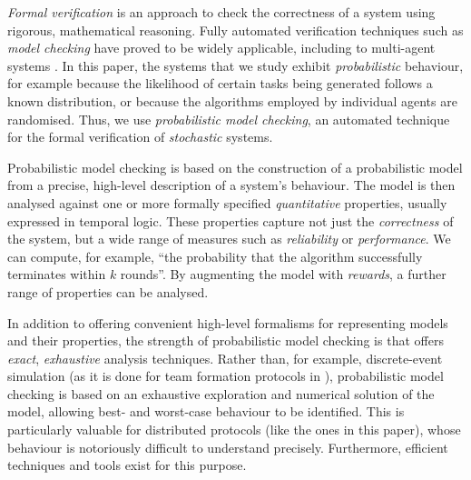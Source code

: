 \documentclass{llncs}
\newcommand{\dave}[1]{\marginpar{\footnotesize \color{red} {\bf D:} \textsf{#1}}}
\begin{document}
\emph{Formal verification} is an approach to check the correctness of a system
using rigorous, mathematical reasoning.
Fully automated verification techniques such as \emph{model checking}
have proved to be widely applicable,
including to multi-agent systems \cite{lomuscio2006mcmas}.
In this paper, the systems that we study exhibit \emph{probabilistic} behaviour,
for example because the likelihood of certain tasks being generated follows a known distribution,
or because the algorithms employed by individual agents are randomised.
Thus, we use \emph{probabilistic model checking}, an automated technique for
the formal verification of \emph{stochastic} systems.
%

Probabilistic model checking is based
on the construction of a probabilistic model from a precise,
high-level description of a system's behaviour.
The model is then analysed against one or more formally specified \emph{quantitative} properties,
usually expressed in temporal logic.
These properties capture not just the \emph{correctness} of the system,
but a wide range of measures such as \emph{reliability} or \emph{performance}.
We can compute, for example, ``the probability that the algorithm successfully terminates within $k$ rounds''.
By augmenting the model with \emph{rewards}, a further range of properties can be analysed.

In addition to offering convenient high-level formalisms for representing models and their properties,
the strength of probabilistic model checking is that offers \emph{exact}, \emph{exhaustive} analysis techniques.
Rather than, for example, discrete-event simulation
(as it is done for team formation protocols in \cite{gaston2005agent}),
probabilistic model checking is based on an exhaustive exploration and numerical solution of the model,
allowing best- and worst-case behaviour to be identified.
This is particularly valuable for distributed protocols (like the ones in this paper),
whose behaviour is notoriously difficult to understand precisely. %
Furthermore, efficient techniques and tools exist for this purpose.
\end{document}
